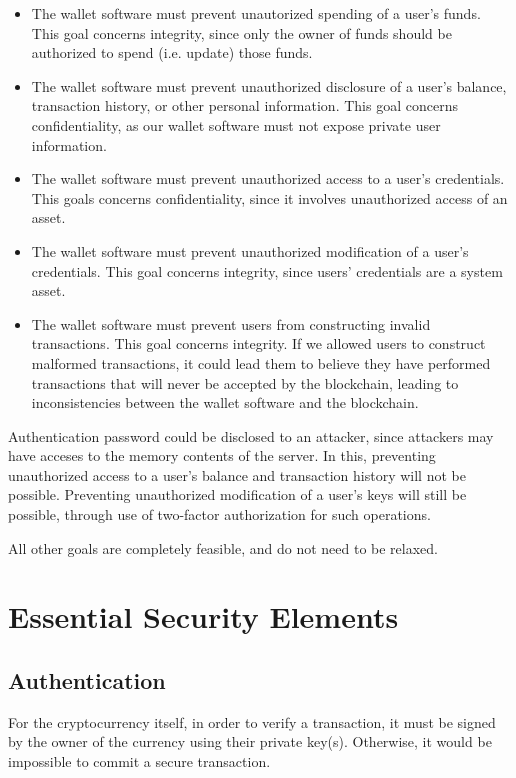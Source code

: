 \documentclass[12pt]{article}
\begin{document}
\begin{itemize}
\item The wallet software must prevent unautorized spending of a user's funds. This goal concerns integrity, since only the owner of funds should be authorized to spend (i.e. update) those funds.
\item The wallet software must prevent unauthorized disclosure of a user's balance, transaction history, or other personal information. This goal concerns confidentiality, as our wallet software must not expose private user information.
\item The wallet software must prevent unauthorized access to a user's credentials. This goals concerns confidentiality, since it involves unauthorized access of an asset.
\item The wallet software must prevent unauthorized modification of a user's credentials. This goal concerns integrity, since users' credentials are a system asset.
\item The wallet software must prevent users from constructing invalid transactions. This goal concerns integrity. If we allowed users to construct malformed transactions, it could lead them to believe they have performed transactions that will never be accepted by the blockchain, leading to inconsistencies between the wallet software and the blockchain.
\end{itemize}

Authentication password could be disclosed to an attacker, since attackers may have acceses to the memory contents of the server. In this, preventing unauthorized access to a user's balance and transaction history will not be possible. Preventing unauthorized modification of a user's keys will still be possible, through use of two-factor authorization for such operations.

All other goals are completely feasible, and do not need to be relaxed.

\section{Essential Security Elements}

\subsection{Authentication}

For the cryptocurrency itself, in order to verify a transaction, it must be signed by the owner of the currency using their private key(s).
Otherwise, it would be impossible to commit a secure transaction.
\end{document}
